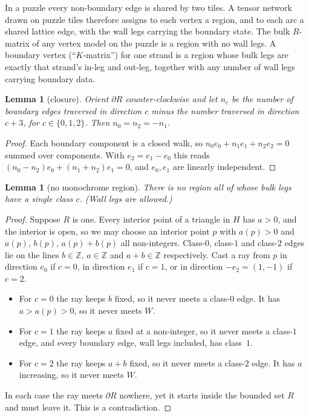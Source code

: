 \documentclass[11pt]{article}
\newtheorem{lemma}[theorem]{Lemma}
\theoremstyle{definition}
\begin{document}
In a puzzle every non-boundary edge is shared by two tiles. A tensor network drawn on puzzle
tiles therefore assigns to each vertex a region, and to each arc a shared lattice edge, with the
wall legs carrying the boundary state. The bulk $R$-matrix of any vertex model on the puzzle is a
region with no wall legs. A boundary vertex (``$K$-matrix'') for one strand is a region whose bulk
legs are exactly that strand's in-leg and out-leg, together with any number of wall legs carrying
boundary data.

\begin{lemma}[closure]\label{lem:closure}
Orient $\partial R$ counter-clockwise and let $n_c$ be the number of boundary edges traversed in
direction $c$ minus the number traversed in direction $c+3$, for $c\in\{0,1,2\}$. Then
$n_0=n_2=-n_1$.
\end{lemma}
\begin{proof}
Each boundary component is a closed walk, so $n_0e_0+n_1e_1+n_2e_2=0$ summed over components. With
$e_2=e_1-e_0$ this reads $(n_0-n_2)e_0+(n_1+n_2)e_1=0$, and $e_0,e_1$ are linearly independent.
\end{proof}

\begin{lemma}[no monochrome region]\label{lem:mono}
There is no region all of whose bulk legs have a single class $c$. (Wall legs are allowed.)
\end{lemma}
\begin{proof}
Suppose $R$ is one. Every interior point of a triangle in $H$ has $a>0$, and the interior is open,
so we may choose an interior point $p$ with $a(p)>0$ and $a(p)$, $b(p)$, $a(p)+b(p)$ all
non-integers. Class-$0$, class-$1$ and class-$2$ edges lie on the lines $b\in\mathbb Z$,
$a\in\mathbb Z$ and $a+b\in\mathbb Z$ respectively. Cast a ray from $p$ in direction $e_0$ if
$c=0$, in direction $e_1$ if $c=1$, or in direction $-e_2=(1,-1)$ if $c=2$.
\begin{itemize}
\item For $c=0$ the ray keeps $b$ fixed, so it never meets a class-$0$ edge. It has $a>a(p)>0$, so
it never meets $W$.
\item For $c=1$ the ray keeps $a$ fixed at a non-integer, so it never meets a class-$1$ edge, and
every boundary edge, wall legs included, has class~$1$.
\item For $c=2$ the ray keeps $a+b$ fixed, so it never meets a class-$2$ edge. It has $a$
increasing, so it never meets $W$.
\end{itemize}
In each case the ray meets $\partial R$ nowhere, yet it starts inside the bounded set $R$ and must
leave it. This is a contradiction.
\end{proof}
\end{document}
